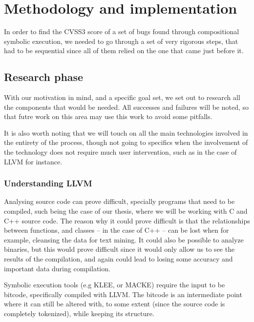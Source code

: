 
\chapter{Methodology and implementation}\label{chapter:Methodology and implementation}

In order to find the CVSS3 score of a set of bugs found through compositional symbolic execution, we needed to go through a set of very rigorous steps, that had to be sequential since all of them relied on the one that came just before it.

\section{Research phase}

With our motivation in mind, and a specific goal set, we set out to research all the components that would be needed. All successes and failures will be noted, so that futre work on this area may use this work to avoid some pitfalls.

It is also worth noting that we will touch on all the main technologies involved in the entirety of the process, though not going to specifics when the involvement of the technology does not require much user intervention, such as in the case of LLVM for instance.

\subsection{Understanding LLVM}

Analysing source code can prove difficult, specially programs that need to be compiled, such being the case of our thesis, where we will be working with C and C++ source code. The reason why it could prove difficult is that the relationships between functions, and classes -- in the case of C++ -- can be lost when for example, cleansing the data for text mining. It could also be possible to analyze binaries, but this would prove difficult since it would only allow us to see the results of the compilation, and again could lead to losing some accuracy and important data during compilation.

Symbolic execution tools (e.g KLEE, or MACKE) require the input to be bitcode, specifically compiled with LLVM. The bitcode is an intermediate point where it can still be altered with, to some extent (since the source code is completely tokenized), while keeping its structure.

